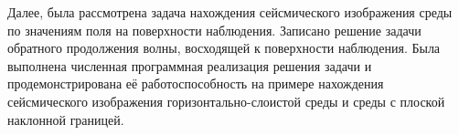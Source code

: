 \documentclass[a4paper, fontsize=14pt]{article}
\begin{document}
	Далее, была рассмотрена задача нахождения сейсмического изображения среды по значениям поля на поверхности наблюдения. Записано решение задачи обратного продолжения волны, восходящей к поверхности наблюдения. 
	Была выполнена численная программная реализация решения задачи и продемонстрирована её работоспособность на примере нахождения  сейсмического изображения горизонтально-слоистой среды и среды с плоской наклонной границей. 
	
	
	
	

	
	\newpage
	
	
	\printbibliography

	
\end{document}

